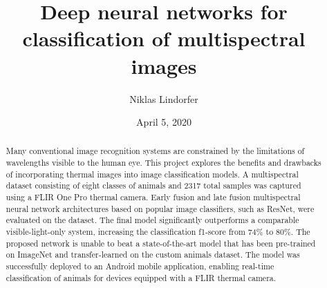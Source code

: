 \documentclass{l4proj}
\begin{document}
\title{Deep neural networks for classification of multispectral images}
\author{Niklas Lindorfer}
\date{April 5, 2020}

\maketitle

\begin{abstract}
    Many conventional image recognition systems are constrained by the limitations of wavelengths visible to the human eye.
    This project explores the benefits and drawbacks of incorporating thermal images into image classification models. A multispectral dataset consisting of eight classes of animals and 2317 total samples was captured using a FLIR One Pro thermal camera.
    Early fusion and late fusion multispectral neural network architectures based on popular image classifiers, such as ResNet, were evaluated on the dataset.
    The final model significantly outperforms a comparable visible-light-only system, increasing the classification f1-score from 74\% to 80\%. The proposed network is unable to beat a state-of-the-art model that has been pre-trained on ImageNet and transfer-learned on the custom animals dataset.
    The model was successfully deployed to an Android mobile application, enabling real-time classification of animals for devices equipped with a FLIR thermal camera.
\end{abstract}


%
%
\def\consentname {Niklas Lindorfer} %
\def\consentdate {26 September 2019} %
%
\educationalconsent


\tableofcontents
\end{document}
